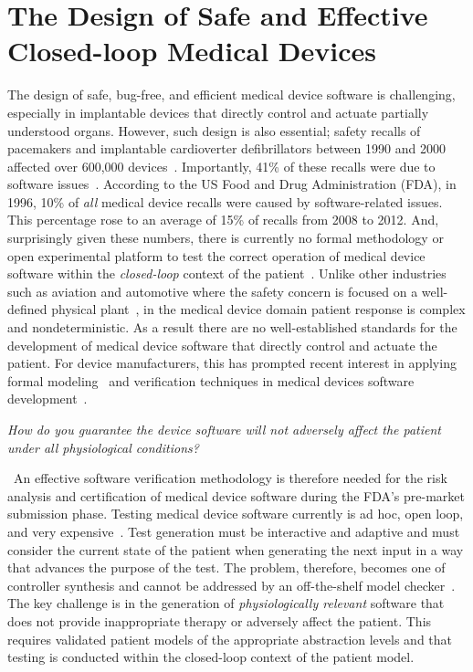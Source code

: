  \section{The Design of Safe and Effective Closed-loop Medical Devices}
The design of safe, bug-free, and efficient medical device software is challenging, especially in implantable devices that directly control and actuate partially understood organs. However, such design is also essential; safety recalls of pacemakers and implantable cardioverter defibrillators between 1990 and 2000 affected over 600,000 devices~\cite{recalls}. Importantly, 41\% of these recalls were due to software issues~\cite{medstats1}. 
According to the US Food and Drug Administration (FDA), in 1996, 10\% of \emph{all} medical device recalls were caused by software-related issues. This percentage rose to an average of 15\% of recalls from 2008 to 2012. 
 And, surprisingly given these numbers, there is currently no formal methodology or open experimental platform to test the correct operation of medical device software within the \emph{closed-loop} context of the patient~\cite{killedbycode}. Unlike other industries such as aviation and automotive where the safety concern is focused on a well-defined physical plant~\cite{autosar,AVSI}, in the medical device domain patient response is complex and nondeterministic. As a result there are no well-established standards for the development of medical device software that directly control and actuate the patient. For device manufacturers, this has prompted recent interest in applying formal modeling~\cite{hcmdss, challenge2, challenge3} and verification techniques in medical devices software development~\cite{med-form2,med-form1}.\vspace{4pt}
 
\emph{How do you guarantee the device software will not adversely affect the patient under all physiological conditions?}

~An effective software verification methodology is therefore needed for the risk analysis and certification of medical device software during the FDA's pre-market submission phase. Testing medical device software currently is ad hoc, open loop, and very expensive~\cite{testing_imd, Vip}. Test generation must be interactive and adaptive and must consider the current state of the patient when generating the next input in a way that advances the purpose of the test. The problem, therefore, becomes one of controller synthesis and cannot be addressed by an off-the-shelf model checker~\cite{rushby}. The key challenge is in the generation of \emph{physiologically relevant} software that does not provide inappropriate therapy or adversely affect the patient. This requires validated patient models of the appropriate abstraction levels and that testing is conducted within the closed-loop context of the patient model.

